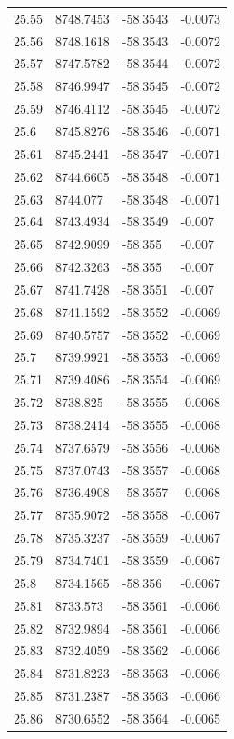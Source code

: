 \begin{table}[H]
\begin{tabular}{llll}
25.55 & 8748.7453 & -58.3543 & -0.0073 \\
25.56 & 8748.1618 & -58.3543 & -0.0072 \\
25.57 & 8747.5782 & -58.3544 & -0.0072 \\
25.58 & 8746.9947 & -58.3545 & -0.0072 \\
25.59 & 8746.4112 & -58.3545 & -0.0072 \\
25.6 & 8745.8276 & -58.3546 & -0.0071 \\
25.61 & 8745.2441 & -58.3547 & -0.0071 \\
25.62 & 8744.6605 & -58.3548 & -0.0071 \\
25.63 & 8744.077 & -58.3548 & -0.0071 \\
25.64 & 8743.4934 & -58.3549 & -0.007 \\
25.65 & 8742.9099 & -58.355 & -0.007 \\
25.66 & 8742.3263 & -58.355 & -0.007 \\
25.67 & 8741.7428 & -58.3551 & -0.007 \\
25.68 & 8741.1592 & -58.3552 & -0.0069 \\
25.69 & 8740.5757 & -58.3552 & -0.0069 \\
25.7 & 8739.9921 & -58.3553 & -0.0069 \\
25.71 & 8739.4086 & -58.3554 & -0.0069 \\
25.72 & 8738.825 & -58.3555 & -0.0068 \\
25.73 & 8738.2414 & -58.3555 & -0.0068 \\
25.74 & 8737.6579 & -58.3556 & -0.0068 \\
25.75 & 8737.0743 & -58.3557 & -0.0068 \\
25.76 & 8736.4908 & -58.3557 & -0.0068 \\
25.77 & 8735.9072 & -58.3558 & -0.0067 \\
25.78 & 8735.3237 & -58.3559 & -0.0067 \\
25.79 & 8734.7401 & -58.3559 & -0.0067 \\
25.8 & 8734.1565 & -58.356 & -0.0067 \\
25.81 & 8733.573 & -58.3561 & -0.0066 \\
25.82 & 8732.9894 & -58.3561 & -0.0066 \\
25.83 & 8732.4059 & -58.3562 & -0.0066 \\
25.84 & 8731.8223 & -58.3563 & -0.0066 \\
25.85 & 8731.2387 & -58.3563 & -0.0066 \\
25.86 & 8730.6552 & -58.3564 & -0.0065 \\

\end{tabular}
\end{table}
